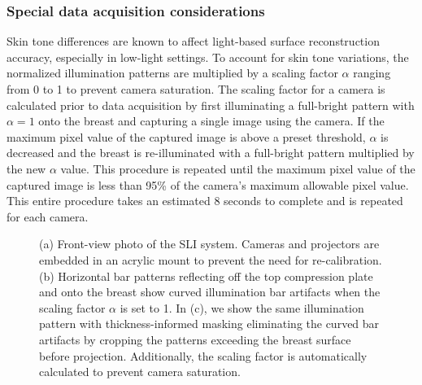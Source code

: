 \subsubsection{Special data acquisition considerations}\label{sec:special}
Skin tone differences are known to affect light-based surface reconstruction accuracy, especially in low-light settings. To account for skin tone variations, the normalized illumination patterns are multiplied by a scaling factor $\alpha$ ranging from 0 to 1 to prevent camera saturation. The scaling factor for a camera is calculated prior to data acquisition by first illuminating a full-bright pattern with $\alpha=1$ onto the breast and capturing a single image using the camera. If the maximum pixel value of the captured image is above a preset threshold, $\alpha$ is decreased and the breast is re-illuminated with a full-bright pattern multiplied by the new $\alpha$ value. This procedure is repeated until the maximum pixel value of the captured image is less than 95\% of the camera's maximum allowable pixel value. This entire procedure takes an estimated 8 seconds to complete and is repeated for each camera.

\begin{figure}
	\begin{center}
	\end{center}
	\caption{(a) Front-view photo of the \ac{SLI} system. Cameras and projectors are embedded in an acrylic mount to prevent the need for re-calibration. (b) Horizontal bar patterns reflecting off the top compression plate and onto the breast show curved illumination bar artifacts when the scaling factor $\alpha$ is set to 1. In (c), we show the same illumination pattern with thickness-informed masking eliminating the curved bar artifacts by cropping the patterns exceeding the breast surface before projection. Additionally, the scaling factor is automatically calculated to prevent camera saturation.} 
	\label{fig:barartifacts}
\end{figure} 


